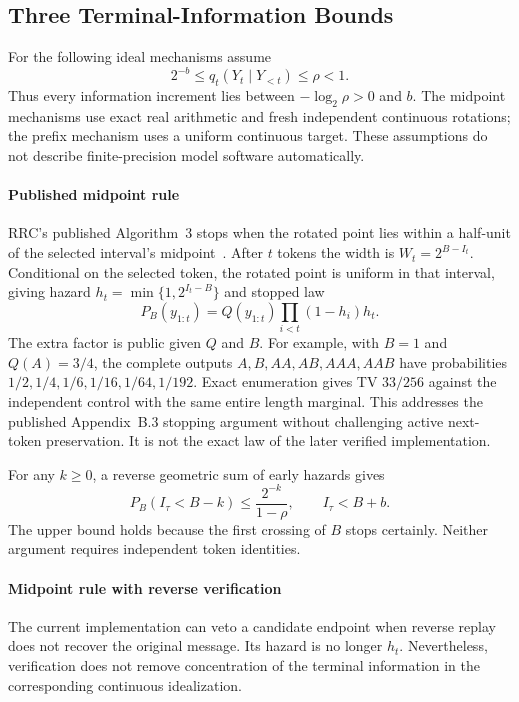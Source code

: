 \subsection{Three Terminal-Information Bounds}
\label{sec:terminal-bands}

For the following ideal mechanisms assume
\begin{equation}
 2^{-b}\le q_t(Y_t\mid Y_{<t})\le\rho<1.
 \label{eq:bounded-increments}
\end{equation}
Thus every information increment lies between $-\log_2\rho>0$ and $b$.
The midpoint mechanisms use exact real arithmetic and fresh independent
continuous rotations; the prefix mechanism uses a uniform continuous target.
These assumptions do not describe finite-precision model software automatically.

\paragraph{Published midpoint rule}
RRC's published Algorithm~3 stops when the rotated point lies within a half-unit
of the selected interval's midpoint~\cite{yan2026rrc}. After $t$ tokens the width
is $W_t=2^{B-I_t}$. Conditional on the selected token, the rotated point is
uniform in that interval, giving hazard $h_t=\min\{1,2^{I_t-B}\}$ and stopped law
\begin{equation}
 P_B(y_{1:t})=Q(y_{1:t})\prod_{i<t}(1-h_i)h_t.
 \label{eq:stopped-law}
\end{equation}
The extra factor is public given $Q$ and $B$. For example, with $B=1$ and
$Q(A)=3/4$, the complete outputs $A,B,AA,AB,AAA,AAB$ have probabilities
$1/2,1/4,1/6,1/16,1/64,1/192$. Exact enumeration gives TV $33/256$ against the
independent control with the same entire length marginal. This addresses the
published Appendix~B.3 stopping argument without challenging active next-token
preservation. It is not the exact law of the later verified implementation.

For any $k\ge0$, a reverse geometric sum of early hazards gives
\begin{equation}
 P_B(I_\tau<B-k)\le\frac{2^{-k}}{1-\rho},\qquad I_\tau<B+b.
 \label{eq:published-band}
\end{equation}
The upper bound holds because the first crossing of $B$ stops certainly.
Neither argument requires independent token identities.

\paragraph{Midpoint rule with reverse verification}
The current implementation can veto a candidate endpoint when reverse replay
does not recover the original message. Its hazard is no longer $h_t$.
Nevertheless, verification does not remove concentration of the terminal
information in the corresponding continuous idealization.

